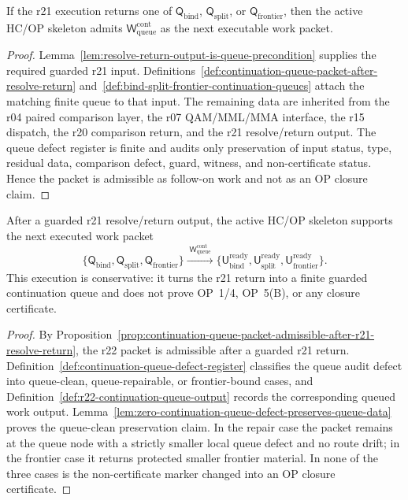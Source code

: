 \begin{proposition}
\label{prop:continuation-queue-packet-admissible-after-r21-resolve-return}
If the r21 execution returns one of \(\mathsf Q_{\mathrm{bind}}\), \(\mathsf Q_{\mathrm{split}}\), or \(\mathsf Q_{\mathrm{frontier}}\), then the active HC/OP skeleton admits \(\mathsf W_{\mathrm{queue}}^{\mathrm{cont}}\) as the next executable work packet.
\end{proposition}

\begin{proof}
Lemma~\ref{lem:resolve-return-output-is-queue-precondition} supplies the required guarded r21 input.  Definitions~\ref{def:continuation-queue-packet-after-resolve-return} and~\ref{def:bind-split-frontier-continuation-queues} attach the matching finite queue to that input.  The remaining data are inherited from the r04 paired comparison layer, the r07 QAM/MML/MMA interface, the r15 dispatch, the r20 comparison return, and the r21 resolve/return output.  The queue defect register is finite and audits only preservation of input status, type, residual data, comparison defect, guard, witness, and non-certificate status.  Hence the packet is admissible as follow-on work and not as an OP closure claim.
\end{proof}

\begin{theorem}
\label{thm:first-continuation-queue-packet-after-resolve-return}
After a guarded r21 resolve/return output, the active HC/OP skeleton supports the next executed work packet
\[
  \{\mathsf Q_{\mathrm{bind}},\mathsf Q_{\mathrm{split}},\mathsf Q_{\mathrm{frontier}}\}
  \xrightarrow{\;\mathsf W_{\mathrm{queue}}^{\mathrm{cont}}\;}
  \{\mathsf U_{\mathrm{bind}}^{\mathrm{ready}},
    \mathsf U_{\mathrm{split}}^{\mathrm{ready}},
    \mathsf U_{\mathrm{frontier}}^{\mathrm{ready}}\}.
\]
This execution is conservative: it turns the r21 return into a finite guarded continuation queue and does not prove OP~1/4, OP~5(B), or any closure certificate.
\end{theorem}

\begin{proof}
By Proposition~\ref{prop:continuation-queue-packet-admissible-after-r21-resolve-return}, the r22 packet is admissible after a guarded r21 return.  Definition~\ref{def:continuation-queue-defect-register} classifies the queue audit defect into queue-clean, queue-repairable, or frontier-bound cases, and Definition~\ref{def:r22-continuation-queue-output} records the corresponding queued work output.  Lemma~\ref{lem:zero-continuation-queue-defect-preserves-queue-data} proves the queue-clean preservation claim.  In the repair case the packet remains at the queue node with a strictly smaller local queue defect and no route drift; in the frontier case it returns protected smaller frontier material.  In none of the three cases is the non-certificate marker changed into an OP closure certificate.
\end{proof}

